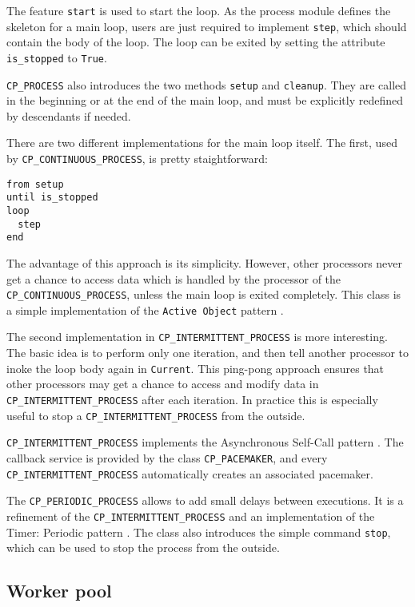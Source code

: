 The feature \lstinline!start! is used to start the loop.
As the process module defines the skeleton for a main loop, users are just required to implement \lstinline!step!, which should contain the body of the loop.
The loop can be exited by setting the attribute \lstinline!is_stopped! to \lstinline!True!.

\lstinline!CP_PROCESS! also introduces the two methods \lstinline!setup! and \lstinline!cleanup!.
They are called in the beginning or at the end of the main loop, and must be explicitly redefined by descendants if needed.

There are two different implementations for the main loop itself.
The first, used by \lstinline!CP_CONTINUOUS_PROCESS!, is pretty staightforward:
\begin{lstlisting}
from setup
until is_stopped
loop
  step
end
\end{lstlisting}
The advantage of this approach is its simplicity.
However, other processors never get a chance to access data which is handled by the processor of the \lstinline!CP_CONTINUOUS_PROCESS!, unless the main loop is exited completely.
This class is a simple implementation of the \lstinline!Active Object! pattern .

The second implementation in \lstinline!CP_INTERMITTENT_PROCESS! is more interesting.
The basic idea is to perform only one iteration, and then tell another processor to inoke the loop body again in \lstinline!Current!.
This ping-pong approach ensures that other processors may get a chance to access and modify data in \lstinline!CP_INTERMITTENT_PROCESS! after each iteration.
In practice this is especially useful to stop a \lstinline!CP_INTERMITTENT_PROCESS! from the outside.

\lstinline!CP_INTERMITTENT_PROCESS! implements the Asynchronous Self-Call pattern .
The callback service is provided by the class \lstinline!CP_PACEMAKER!, and every \lstinline!CP_INTERMITTENT_PROCESS! automatically creates an associated pacemaker.

The \lstinline!CP_PERIODIC_PROCESS! allows to add small delays between executions. 
It is a refinement of the \lstinline!CP_INTERMITTENT_PROCESS! and an implementation of the Timer: Periodic pattern .
The class also introduces the simple command \lstinline!stop!, which can be used to stop the process from the outside.


\subsection{Worker pool}
\label{sec:worker_pool} 

